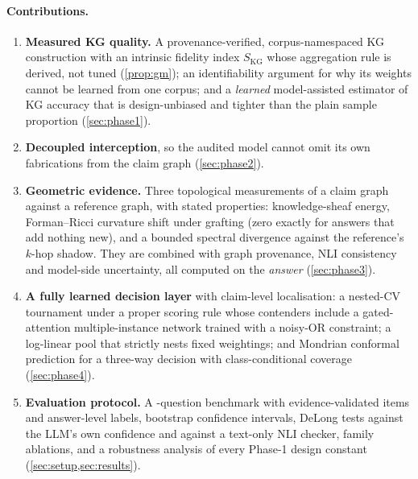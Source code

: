 \documentclass[10pt,twocolumn]{article}
\theoremstyle{remark}
\begin{document}
\paragraph{Contributions.}
\begin{enumerate}\itemsep0pt
\item \textbf{Measured KG quality.} A provenance-verified, corpus-namespaced KG construction with an intrinsic
  fidelity index $S_{\mathrm{KG}}$ whose aggregation rule is derived, not tuned (\cref{prop:gm}); an identifiability
  argument for why its weights cannot be learned from one corpus; and a \emph{learned} model-assisted estimator of KG
  accuracy that is design-unbiased and tighter than the plain sample proportion (\cref{sec:phase1}).
\item \textbf{Decoupled interception}, so the audited model cannot omit its own fabrications from the claim graph
  (\cref{sec:phase2}).
\item \textbf{Geometric evidence.} Three topological measurements of a claim graph against a reference graph,
  with stated properties: knowledge-sheaf energy, Forman--Ricci curvature shift under grafting (zero exactly for
  answers that add nothing new), and a bounded spectral divergence against the reference's $k$-hop shadow. They are
  combined with graph provenance, NLI consistency and model-side uncertainty, all computed on the \emph{answer}
  (\cref{sec:phase3}).
\item \textbf{A fully learned decision layer} with claim-level localisation: a nested-CV tournament under a proper
  scoring rule whose contenders include a gated-attention multiple-instance network trained with a noisy-OR
  constraint; a log-linear pool that strictly nests fixed weightings; and Mondrian conformal prediction for a
  three-way decision with class-conditional coverage (\cref{sec:phase4}).
\item \textbf{Evaluation protocol.} A \NItems-question benchmark with evidence-validated items and answer-level
  labels, bootstrap confidence intervals, DeLong tests against the LLM's own confidence and against a text-only NLI
  checker, family ablations, and a robustness analysis of every Phase-1 design constant
  (\cref{sec:setup,sec:results}).
\end{enumerate}
\end{document}
